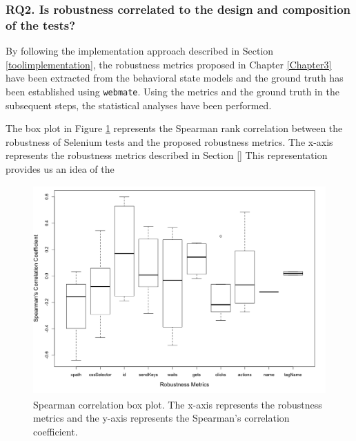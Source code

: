 \subsubsection*{{\bfseries RQ2.} Is robustness correlated to the design and composition of the tests?}

By following the implementation approach described in Section \ref{toolimplementation}, the robustness metrics proposed in Chapter \ref{Chapter3} have been extracted from the behavioral state models and the ground truth has been established using \texttt{webmate}. Using the metrics and the ground truth in the subsequent steps, the statistical analyses have been performed.

The box plot in Figure \ref{fig:spearman} represents the Spearman rank correlation between the robustness of Selenium tests and the proposed robustness metrics. The x-axis represents the robustness metrics described in Section \ref{} This representation provides us an idea of the 


\begin{figure}[ht!] 
\centering     %
\includegraphics[width=14cm,height=8cm]{./Figures/spearman-rq2}
 \captionsetup{justification=justified,
singlelinecheck=false}
\caption{Spearman correlation box plot. The x-axis represents the robustness metrics and the y-axis represents the Spearman's correlation coefficient.}
\label{fig:spearman}
\end{figure} 

